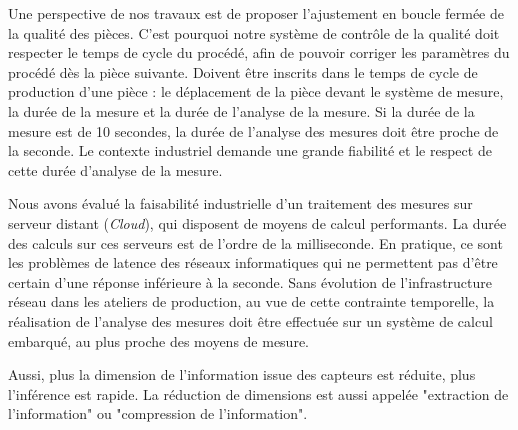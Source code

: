 Une perspective de nos travaux est de proposer l'ajustement en boucle fermée de la qualité des pièces.
C'est pourquoi notre système de contrôle de la qualité doit respecter le temps de cycle du procédé, afin de pouvoir corriger les paramètres du procédé dès la pièce suivante.
Doivent être inscrits dans le temps de cycle de production d'une pièce : le déplacement de la pièce devant le système de mesure, la durée de la mesure et la durée de l'analyse de la mesure.
Si la durée de la mesure est de 10 secondes, la durée de l'analyse des mesures doit être proche de la seconde.
Le contexte industriel demande une grande fiabilité  et le respect de cette durée d'analyse de la mesure.

Nous avons évalué la faisabilité industrielle d'un traitement des mesures sur serveur distant (\textit{Cloud}), qui disposent de moyens de calcul performants.
La durée des calculs sur ces serveurs est de l'ordre de la milliseconde.
En pratique, ce sont les problèmes de latence des réseaux informatiques qui ne permettent pas d'être certain d'une réponse inférieure à la seconde.
Sans évolution de l'infrastructure réseau dans les ateliers de production, au vue de cette contrainte temporelle, la réalisation de l'analyse des mesures doit être effectuée sur un système de calcul embarqué, au plus proche des moyens de mesure.

Aussi, plus la dimension de l'information issue des capteurs est réduite, plus l'inférence est rapide.
La réduction de dimensions est aussi appelée "extraction de l'information" ou "compression de l'information".


